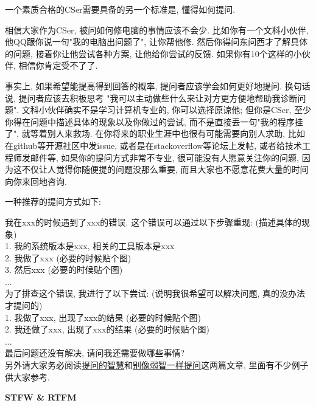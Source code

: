 \begin{refbox}
一个素质合格的CSer需要具备的另一个标准是, 懂得如何提问.

相信大家作为CSer, 被问如何修电脑的事情应该不会少. 比如你有一个文科小伙伴, 他QQ跟你说一句"我的电脑出问题了", 让你帮他修. 然后你得问东问西才了解具体的问题, 接着你让他尝试各种方案, 让他给你尝试的反馈. 如果你有10个这样的小伙伴, 相信你肯定受不了了.

事实上, 如果希望能提高得到回答的概率, 提问者应该学会如何更好地提问. 换句话说, 提问者应该去积极思考 "我可以主动做些什么来让对方更方便地帮助我诊断问题". 文科小伙伴确实不是学习计算机专业的, 你可以选择原谅他; 但你是CSer, 至少你得在问题中描述具体的现象以及你做过的尝试, 而不是直接丢一句"我的程序挂了", 就等着别人来救场. 在你将来的职业生涯中也很有可能需要向别人求助, 比如在github等开源社区中发issue, 或者是在stackoverflow等论坛上发帖, 或者给技术工程师发邮件等, 如果你的提问方式非常不专业, 很可能没有人愿意关注你的问题, 因为这不仅让人觉得你随便提的问题没那么重要, 而且大家也不愿意花费大量的时间向你来回地咨询.

一种推荐的提问方式如下:

我在xxx的时候遇到了xxx的错误. 这个错误可以通过以下步骤重现: (描述具体的现象)\\
1. 我的系统版本是xxx, 相关的工具版本是xxx\\
2. 我做了xxx (必要的时候贴个图)\\
3. 然后xxx (必要的时候贴个图)\\
...\\
为了排查这个错误, 我进行了以下尝试: (说明我很希望可以解决问题, 真的没办法才提问的)\\
1. 我做了xxx, 出现了xxx的结果 (必要的时候贴个图)\\
2. 我还做了xxx, 出现了xxx的结果 (必要的时候贴个图)\\
...\\
最后问题还没有解决, 请问我还需要做哪些事情?\\

另外请大家务必阅读\href{https://github.com/ryanhanwu/How-To-Ask-Questions-The-Smart-Way/blob/main/README-zh_CN.md}{提问的智慧}和\href{https://github.com/tangx/Stop-Ask-Questions-The-Stupid-Ways/blob/master/README.md}{别像弱智一样提问}这两篇文章, 里面有不少例子供大家参考.
\end{refbox}

\textbf{STFW \& RTFM}

